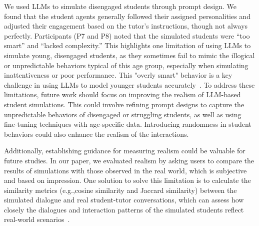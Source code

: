 We used LLMs to simulate disengaged students through prompt design. We found that the student agents generally followed their assigned personalities and adjusted their engagement based on the tutor’s instructions, though not always perfectly. Participants (P7 and P8) noted that the simulated students were ``too smart'' and ``lacked complexity.'' This highlights one limitation of using LLMs to simulate young, disengaged students, as they sometimes fail to mimic the illogical or unpredictable behaviors typical of this age group, especially when simulating inattentiveness or poor performance. This "overly smart" behavior is a key challenge in using LLMs to model younger students accurately~\cite{gpteach,argyle2023out}. To address these limitations, future work should focus on improving the realism of LLM-based student simulations. This could involve refining prompt designs to capture the unpredictable behaviors of disengaged or struggling students, as well as using fine-tuning techniques with age-specific data. Introducing randomness in student behaviors could also enhance the realism of the interactions. 

Additionally, establishing guidance for measuring realism could be valuable for future studies. In our paper, we evaluated realism by asking users to compare the results of simulations with those observed in the real world, which is subjective and based on impression. One solution to solve this limitation is to calculate the similarity metrics (e.g.,cosine similarity and Jaccard similarity) between the simulated dialogue and real student-tutor conversations, which can assess how closely the dialogues and interaction patterns of the simulated students reflect real-world scenarios~\cite{lau2016empirical, niwattanakul2013using}. 




\label{sec:discussion}

